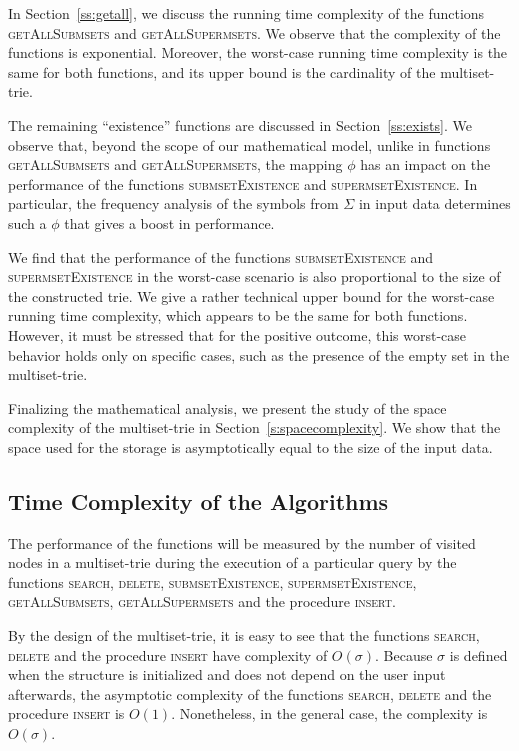 \documentclass[algorithms,article,accept,pdftex,moreauthors]{Definitions/mdpi}
\begin{document}
In Section~\ref{ss:getall}, we discuss the running time complexity of the functions 
\textsc{getAllSubmsets} and \textsc{getAllSupermsets}. We observe that the 
complexity of the functions is exponential. Moreover, the worst-case running time 
complexity is the same for both functions, and its upper bound is the cardinality of 
the multiset-trie.

The remaining ``existence'' functions are discussed in Section~\ref{ss:exists}. 
We observe that, beyond the scope of our mathematical model, unlike in functions 
\textsc{getAllSubmsets} and \textsc{getAllSupermsets}, the mapping $\phi$ has an 
impact on the performance of the functions \textsc{submsetExistence} and 
\textsc{supermsetExistence}. In particular, the frequency analysis of the symbols 
from $\Sigma$ in input data determines such a $\phi$ that gives a boost in performance. 

We find that the performance of the functions \textsc{submsetExistence} and 
\textsc{supermsetExistence} in the worst-case scenario is also proportional to the size of the constructed trie. We give a rather technical upper 
bound for the worst-case running time complexity, which appears to be the same 
for both functions. 
However, it must be stressed that for the positive outcome, this 
worst-case behavior holds only on specific cases, such as the presence of the empty set 
in the multiset-trie. 

Finalizing the mathematical analysis, we present the study of the space complexity 
of the multiset-trie in Section~\ref{s:spacecomplexity}. We show that the space 
used for the storage is asymptotically equal to the size of the input data. 

\subsection{Time Complexity of the Algorithms}\label{s:timecomplexity}
The performance of the functions will be measured by the number of 
visited nodes in a multiset-trie during the execution of a particular query by the 
functions \textsc{search}, \textsc{delete}, \textsc{submsetExistence}, 
\textsc{supermsetExistence}, \textsc{getAllSubmsets}, \textsc{getAllSupermsets} 
and the procedure \textsc{insert}.
%

By the design of the multiset-trie, it is easy to see that the functions \textsc{search},
\textsc{delete} and the procedure \textsc{insert} have complexity of $O(\sigma).$
Because $\sigma$ is defined when the structure is initialized and does not depend
on the user input afterwards, the asymptotic complexity of the functions \textsc{search}, 
\textsc{delete} and the procedure \textsc{insert} is $O(1).$ Nonetheless, in the general 
case, the complexity is $O(\sigma).$
\end{document}
